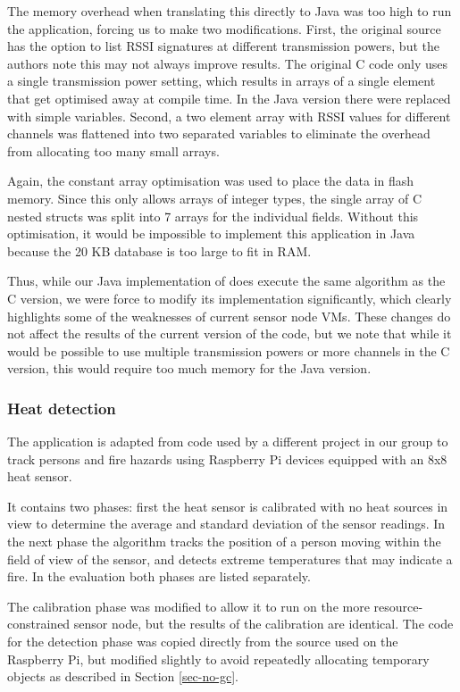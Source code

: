 The memory overhead when translating this directly to Java was too high to run the application, forcing us to make two modifications. First, the original source has the option to list RSSI signatures at different transmission powers, but the authors note this may not always improve results. The original C code only uses a single transmission power setting, which results in arrays of a single element that get optimised away at compile time. In the Java version there were replaced with simple variables. Second, a two element array with RSSI values for different channels was flattened into two separated variables to eliminate the overhead from allocating too many small arrays.

Again, the constant array optimisation was used to place the data in flash memory. Since this only allows arrays of integer types, the single array of C nested structs was split into 7 arrays for the individual fields. Without this optimisation, it would be impossible to implement this application in Java because the 20 KB database is too large to fit in RAM.

Thus, while our Java implementation of  does execute the same algorithm as the C version, we were force to modify its implementation significantly, which clearly highlights some of the weaknesses of current sensor node VMs. These changes do not affect the results of the current version of the code, but we note that while it would be possible to use multiple transmission powers or more channels in the C version, this would require too much memory for the Java version.

\subsubsection{Heat detection}
The  application is adapted from code used by a different project in our group to track persons and fire hazards using Raspberry Pi devices equipped with an 8x8 heat sensor.

It contains two phases: first the heat sensor is calibrated with no heat sources in view to determine the average and standard deviation of the sensor readings. In the next phase the algorithm tracks the position of a person moving within the field of view of the sensor, and detects extreme temperatures that may indicate a fire. In the evaluation both phases are listed separately.

The calibration phase was modified to allow it to run on the more resource-constrained sensor node, but the results of the calibration are identical. The code for the detection phase was copied directly from the source used on the Raspberry Pi, but modified slightly to avoid repeatedly allocating temporary objects as described in Section \ref{sec-no-gc}.

